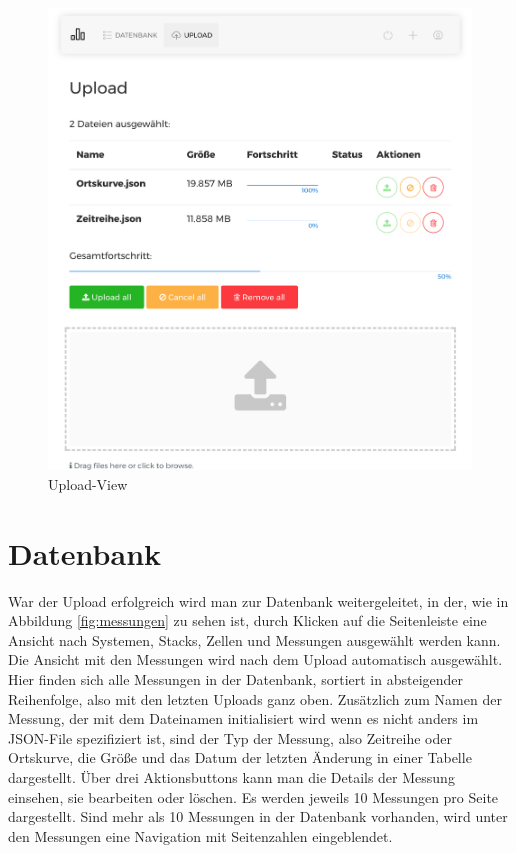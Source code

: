 \begin{figure}
\centering
\includegraphics[width=\textwidth]{Figures/upload}
\caption{Upload-View}
\label{fig:upload}
\end{figure}


\section{Datenbank}

War der Upload erfolgreich wird man zur Datenbank weitergeleitet, in der, wie in Abbildung \ref{fig:messungen} zu sehen ist, durch Klicken auf die Seitenleiste eine Ansicht nach Systemen, Stacks, Zellen und Messungen ausgewählt werden kann. Die Ansicht mit den Messungen wird nach dem Upload automatisch ausgewählt. Hier finden sich alle Messungen in der Datenbank, sortiert in absteigender Reihenfolge, also mit den letzten Uploads ganz oben. Zusätzlich zum Namen der Messung, der mit dem Dateinamen initialisiert wird wenn es nicht anders im JSON-File spezifiziert ist, sind der Typ der Messung, also Zeitreihe oder Ortskurve, die Größe und das Datum der letzten Änderung in einer Tabelle dargestellt. Über drei Aktionsbuttons kann man die Details der Messung einsehen, sie bearbeiten oder löschen. Es werden jeweils 10 Messungen pro Seite dargestellt. Sind mehr als 10 Messungen in der Datenbank vorhanden, wird unter den Messungen eine Navigation mit Seitenzahlen eingeblendet.

